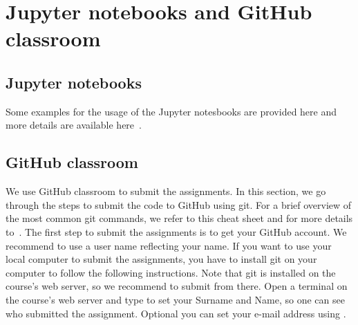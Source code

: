 \documentclass[11pt,fleqn]{book} %
\begin{document}
\chapter*{Jupyter notebooks and GitHub classroom}

\section*{Jupyter notebooks}

Some examples for the usage of the Jupyter notesbooks are provided here and more details are available here~\cite{diehl2020gateways}.

\section*{GitHub classroom}

We use GitHub classroom to submit the assignments. In this section, we go through the steps to submit the code to GitHub using git. For a brief overview of the most common git commands, we refer to this cheat sheet and for more details to~\cite{silverman2013git,laster2016professional}. The first step to submit the assignments is to get your GitHub account. We recommend to use a user name reflecting your name. If you want to use your local computer to submit the assignments, you have to install git on your computer to follow the following instructions. Note that git is installed on the course's web server, so we recommend to submit from there. Open a terminal on the course's web server and type  to set your Surname and Name, so one can see who submitted the assignment. Optional you can set your e-mail address using . \\
\end{document}
